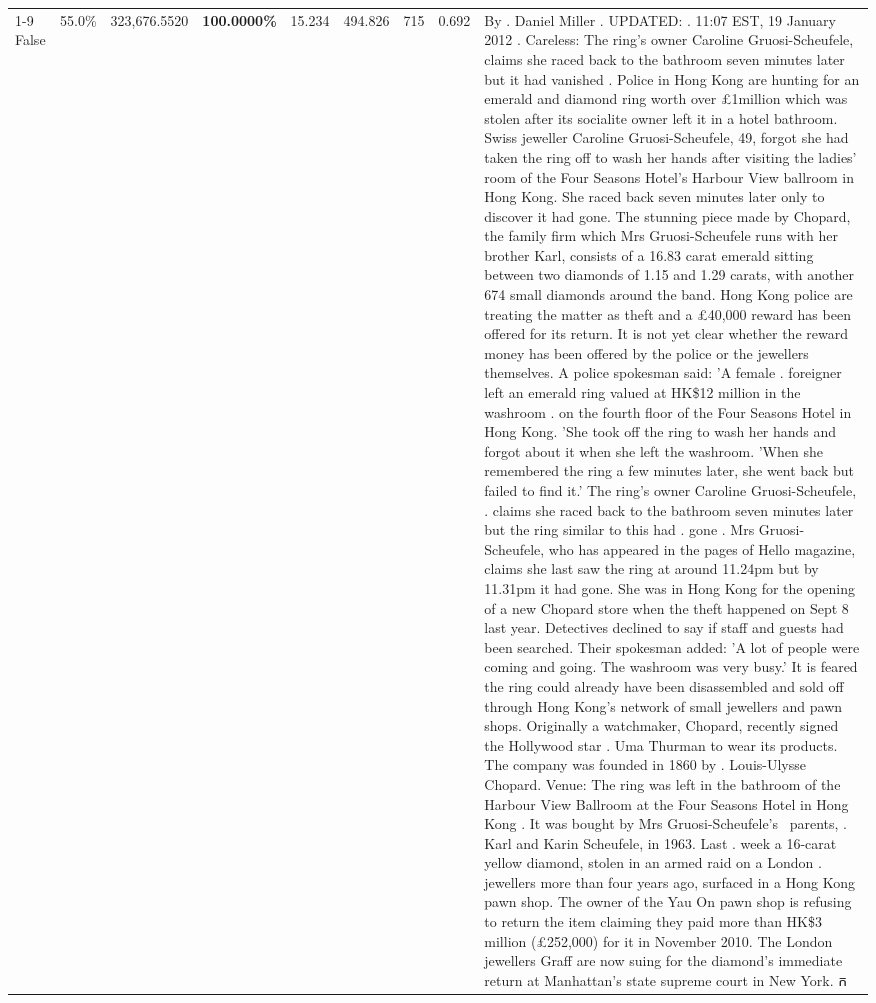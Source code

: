\begin{table}[H]
\begin{tabular}{lllrlllll}
\cline{1-9}
False & 55.0\% & 323,676.5520 & \bfseries \color{red} 100.0000\% & 15.234 & 494.826 & 715 & 0.692 & By . Daniel Miller . UPDATED: . 11:07 EST, 19 January 2012 . Careless: The ring's owner Caroline Gruosi-Scheufele, claims she raced back to the bathroom seven minutes later but it had vanished . Police in Hong Kong are hunting for an emerald and diamond ring worth over £1million which was stolen after its socialite owner left it in a hotel bathroom. Swiss jeweller Caroline Gruosi-Scheufele, 49, forgot she had taken the ring off to wash her hands after visiting the ladies' room of the Four Seasons Hotel's Harbour View ballroom in Hong Kong. She raced back seven minutes later only to discover it had gone. The stunning piece made by Chopard, the family firm which Mrs Gruosi-Scheufele runs with her brother Karl, consists of a 16.83 carat emerald sitting between two diamonds of 1.15 and 1.29 carats, with another 674 small diamonds around the band. Hong Kong police are treating the matter as theft and a £40,000 reward has been offered for its return. It is not yet clear whether the reward money has been offered by the police or the jewellers themselves. A police spokesman said: 'A female . foreigner left an emerald ring valued at HK\$12 million in the washroom . on the fourth floor of the Four Seasons Hotel in Hong Kong. 'She took off the ring to wash her hands and forgot about it when she left the washroom. 'When she remembered the ring a few minutes later, she went back but failed to find it.' The ring's owner Caroline Gruosi-Scheufele, . claims she raced back to the bathroom seven minutes later but the ring similar to this had . gone . Mrs Gruosi-Scheufele, who has appeared in the pages of Hello magazine, claims she last saw the ring at around 11.24pm but by 11.31pm it had gone. She was in Hong Kong for the opening of a new Chopard store when the theft happened on Sept 8 last year. Detectives declined to say if staff and guests had been searched. Their spokesman added: 'A lot of people were coming and going. The washroom was very busy.' It is feared the ring could already have been disassembled and sold off through Hong Kong's network of small jewellers and pawn shops. Originally a watchmaker, Chopard, recently signed the Hollywood star . Uma Thurman to wear its products. The company was founded in 1860 by . Louis-Ulysse Chopard. Venue: The ring was left in the bathroom of the Harbour View Ballroom at the Four Seasons Hotel in Hong Kong . It was bought by Mrs Gruosi-Scheufele's  parents, . Karl and Karin Scheufele, in 1963. Last . week a 16-carat yellow diamond, stolen in an armed raid on a London . jewellers more than four years ago, surfaced in a Hong Kong pawn shop. The owner of the Yau On pawn shop is refusing to return the item claiming they paid more than HK\$3 million (£252,000) for it in November 2010. The London jewellers Graff are now suing for the diamond’s immediate return at Manhattan’s state supreme court in New York. ក \\

\end{tabular}
\end{table}

